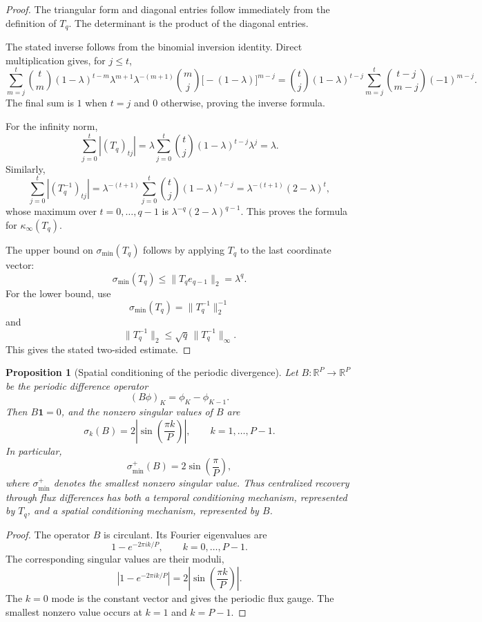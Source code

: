 \documentclass[preprint,12pt]{elsarticle}
\theoremstyle{plain}
\newtheorem{proposition}{Proposition}
\theoremstyle{remark}
\theoremstyle{definition}
\begin{document}
\begin{proof}
The triangular form and diagonal entries follow immediately from the
definition of \(T_q\).  The determinant is the product of the diagonal
entries.

The stated inverse follows from the binomial inversion identity.  Direct
multiplication gives, for \(j\le t\),
\[
  \sum_{m=j}^{t}
  \binom{t}{m}(1-\lambda)^{t-m}\lambda^{m+1}
  \lambda^{-(m+1)}
  \binom{m}{j}\bigl[-(1-\lambda)\bigr]^{m-j}
  =
  \binom{t}{j}(1-\lambda)^{t-j}
  \sum_{m=j}^{t}
  \binom{t-j}{m-j}(-1)^{m-j}.
\]
The final sum is \(1\) when \(t=j\) and \(0\) otherwise, proving the inverse
formula.

For the infinity norm,
\[
  \sum_{j=0}^{t}
  |(T_q)_{tj}|
  =
  \lambda
  \sum_{j=0}^{t}
  \binom{t}{j}(1-\lambda)^{t-j}\lambda^j
  =
  \lambda.
\]
Similarly,
\[
  \sum_{j=0}^{t}
  |(T_q^{-1})_{tj}|
  =
  \lambda^{-(t+1)}
  \sum_{j=0}^{t}
  \binom{t}{j}(1-\lambda)^{t-j}
  =
  \lambda^{-(t+1)}(2-\lambda)^t,
\]
whose maximum over \(t=0,\ldots,q-1\) is
\(\lambda^{-q}(2-\lambda)^{q-1}\).  This proves the formula for
\(\kappa_\infty(T_q)\).

The upper bound on \(\sigma_{\min}(T_q)\) follows by applying \(T_q\) to the
last coordinate vector:
\[
  \sigma_{\min}(T_q)\le \|T_q e_{q-1}\|_2=\lambda^q.
\]
For the lower bound, use
\[
  \sigma_{\min}(T_q)=\|T_q^{-1}\|_2^{-1}
\]
and
\[
  \|T_q^{-1}\|_2\le \sqrt q\,\|T_q^{-1}\|_\infty.
\]
This gives the stated two-sided estimate.
\end{proof}

\begin{proposition}[Spatial conditioning of the periodic divergence]
\label{prop:spatial-conditioning}
Let \(B:\mathbb R^P\to\mathbb R^P\) be the periodic difference operator
\[
  (B\phi)_K=\phi_K-\phi_{K-1}.
\]
Then \(B\mathbf 1=0\), and the nonzero singular values of \(B\) are
\[
  \sigma_k(B)
  =
  2\left|\sin\left(\frac{\pi k}{P}\right)\right|,
  \qquad
  k=1,\ldots,P-1.
\]
In particular,
\[
  \sigma_{\min}^+(B)
  =
  2\sin\left(\frac{\pi}{P}\right),
\]
where \(\sigma_{\min}^+\) denotes the smallest nonzero singular value.
Thus centralized recovery through flux differences has both a temporal
conditioning mechanism, represented by \(T_q\), and a spatial conditioning
mechanism, represented by \(B\).
\end{proposition}

\begin{proof}
The operator \(B\) is circulant.  Its Fourier eigenvalues are
\[
  1-e^{-2\pi i k/P},
  \qquad
  k=0,\ldots,P-1.
\]
The corresponding singular values are their moduli,
\[
  |1-e^{-2\pi i k/P}|
  =
  2\left|\sin\left(\frac{\pi k}{P}\right)\right|.
\]
The \(k=0\) mode is the constant vector and gives the periodic flux gauge.
The smallest nonzero value occurs at \(k=1\) and \(k=P-1\).
\end{proof}
\end{document}

